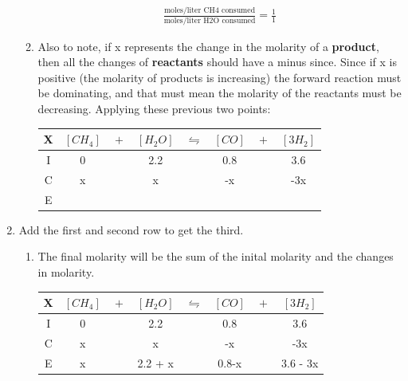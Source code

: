 \documentclass{article}  %
\begin{document}
\begin{enumerate}
\begin{enumerate}
            \begin{equation*}
                \begin{aligned}
                    \frac{\text{moles/liter CH4 consumed}}{\text{moles/liter H2O consumed}} = \frac{1}{1}
                \end{aligned}
            \end{equation*}
            \item Also to note, if x represents the change in the molarity of a \textbf{product}, then all the changes of \textbf{reactants} should have a minus since. Since if x is positive (the molarity of products is increasing) the forward reaction must be dominating, and that must mean the molarity of the reactants must be decreasing. Applying these previous two points: \\
            \begin{tabular}{c|c@{}c@{}c@{}c@{}c@{}c@{}c}
                \hline
                X   & $[CH_4]$ & ${}+{}$ & $[H_2O]$ & ${}\leftrightharpoons{}$ & $[CO]$ & ${}+{}$ & $[3H_2]$ \\
                \hline
                I   &  0    && 2.2    &&  0.8   && 3.6  \\
                C   &  x    &&  x   &&  -x   && -3x  \\
                E   &      &&     &&     &&   \\      
            \end{tabular}
        \end{enumerate}  
    \item Add the first and second row to get the third.
        \begin{enumerate}
            \item The final molarity will be the sum of the inital molarity and the changes in molarity. \\
            \begin{tabular}{c|c@{}c@{}c@{}c@{}c@{}c@{}c}
                \hline
                X   & $[CH_4]$ & ${}+{}$ & $[H_2O]$ & ${}\leftrightharpoons{}$ & $[CO]$ & ${}+{}$ & $[3H_2]$ \\
                \hline
                I   &  0    && 2.2    &&  0.8   && 3.6  \\
                C   &  x    &&  x   &&  -x   && -3x  \\
                E   &  x    &&  2.2 + x   && 0.8-x    && 3.6 - 3x  \\      
            \end{tabular}
        \end{enumerate}
\end{enumerate}
\end{document}
